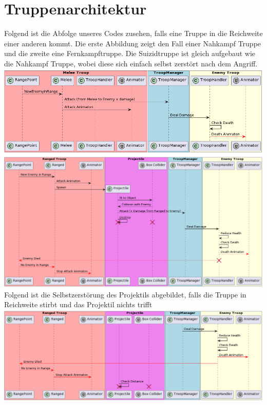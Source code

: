 \section{Truppenarchitektur}
Folgend ist die Abfolge unseres Codes zusehen, falls eine Truppe in die Reichweite einer anderen kommt.
Die erste Abbildung zeigt den Fall einer Nahkampf Truppe und die zweite eine Fernkampftruppe.
Die Suizidtruppe ist gleich aufgebaut wie die Nahkampf Truppe, wobei diese sich einfach selbst zerstört nach dem Angriff. \\
\includegraphics[width=16cm]{resources/MeleeAttacks.png} \\
\includegraphics[width=16cm]{resources/RangedAttacks.png} \\
Folgend ist die Selbstzerstörung des Projektils abgebildet, falls die Truppe in Reichweite stirbt und das Projektil nichts trifft \\
\includegraphics[width=16cm]{resources/Projectile.png} \\

